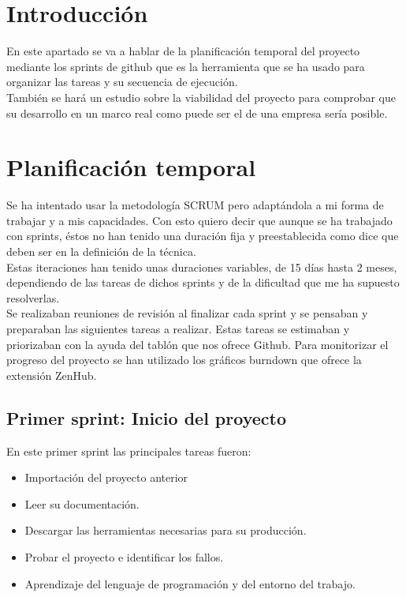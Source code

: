 
\section{Introducción}
En este apartado se va a hablar de la planificación temporal del proyecto mediante los sprints de github que es la herramienta que se ha usado para organizar las tareas y su secuencia de ejecución.\\
También se hará un estudio sobre la viabilidad del proyecto para comprobar que su desarrollo en un marco real como puede ser el de una empresa sería posible.
\section{Planificación temporal}
Se ha intentado usar la metodología SCRUM pero adaptándola a mi forma de trabajar y a mis capacidades. Con esto quiero decir que aunque se ha trabajado con sprints, éstos no han tenido una duración fija y preestablecida como dice que deben ser en la definición de la técnica.\\
Estas iteraciones han tenido unas duraciones variables, de 15 días hasta 2 meses, dependiendo de las tareas de dichos sprints y de la dificultad que me ha supuesto resolverlas.\\
Se realizaban reuniones de revisión al finalizar cada sprint y se pensaban y preparaban las siguientes tareas a realizar.
Estas tareas se estimaban y priorizaban con la ayuda del tablón que nos ofrece Github.
Para monitorizar el progreso del proyecto se han utilizado los gráficos burndown que ofrece la extensión ZenHub.
\subsection{Primer sprint: Inicio del proyecto}
En este primer sprint las principales tareas fueron:
\begin{itemize}
    \item Importación del proyecto anterior
    \item Leer su documentación.
    \item Descargar las herramientas necesarias para su producción.
    \item Probar el proyecto e identificar los fallos.
    \item Aprendizaje del lenguaje de programación y del entorno del trabajo.
\end{itemize}
